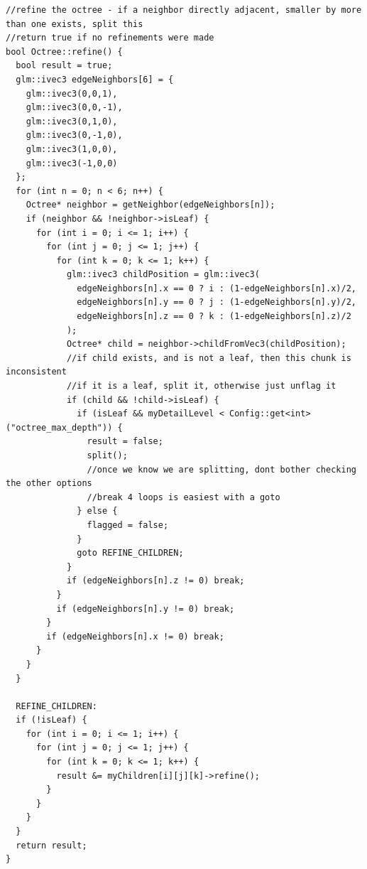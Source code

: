 \documentclass{article}
\begin{document}
\begin{enumerate}
\begin{lstlisting}
//refine the octree - if a neighbor directly adjacent, smaller by more than one exists, split this
//return true if no refinements were made
bool Octree::refine() {
  bool result = true;
  glm::ivec3 edgeNeighbors[6] = {
    glm::ivec3(0,0,1),
    glm::ivec3(0,0,-1),
    glm::ivec3(0,1,0),
    glm::ivec3(0,-1,0),
    glm::ivec3(1,0,0),
    glm::ivec3(-1,0,0)
  };
  for (int n = 0; n < 6; n++) {
    Octree* neighbor = getNeighbor(edgeNeighbors[n]);
    if (neighbor && !neighbor->isLeaf) {
      for (int i = 0; i <= 1; i++) {
        for (int j = 0; j <= 1; j++) {
          for (int k = 0; k <= 1; k++) {
            glm::ivec3 childPosition = glm::ivec3(
              edgeNeighbors[n].x == 0 ? i : (1-edgeNeighbors[n].x)/2,
              edgeNeighbors[n].y == 0 ? j : (1-edgeNeighbors[n].y)/2,
              edgeNeighbors[n].z == 0 ? k : (1-edgeNeighbors[n].z)/2
            );
            Octree* child = neighbor->childFromVec3(childPosition);
            //if child exists, and is not a leaf, then this chunk is inconsistent
            //if it is a leaf, split it, otherwise just unflag it
            if (child && !child->isLeaf) {
              if (isLeaf && myDetailLevel < Config::get<int>("octree_max_depth")) {
                result = false;
                split();
                //once we know we are splitting, dont bother checking the other options
                //break 4 loops is easiest with a goto
              } else {
                flagged = false;
              }
              goto REFINE_CHILDREN;
            }
            if (edgeNeighbors[n].z != 0) break;
          }
          if (edgeNeighbors[n].y != 0) break;
        }
        if (edgeNeighbors[n].x != 0) break;
      }
    }
  }
  
  REFINE_CHILDREN:
  if (!isLeaf) {
    for (int i = 0; i <= 1; i++) {
      for (int j = 0; j <= 1; j++) {
        for (int k = 0; k <= 1; k++) {
          result &= myChildren[i][j][k]->refine();
        }
      }
    }
  }
  return result;
}
  \end{lstlisting}


\end{enumerate}
\end{document}
